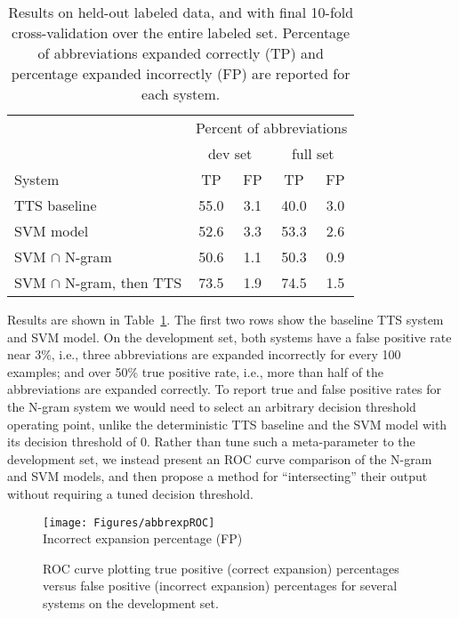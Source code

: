 \documentclass[11pt]{article}
\begin{document}
\begin{table}[b!]\vspace*{-0.15in}
\begin{center}
{\footnotesize
\begin{tabular}{|l|c|c||c|c|}
\hline
& \multicolumn{4}{c|}{Percent of abbreviations}\\
& \multicolumn{2}{c||}{dev set} & \multicolumn{2}{c|}{full set}\\
System & TP & FP  & TP & FP\\\hline
TTS baseline & 55.0 & 3.1 & 40.0 & 3.0\\\hline
SVM model & 52.6 & 3.3 & 53.3 & 2.6\\\hline\hline
SVM $\cap$ N-gram  & 50.6 & 1.1 & 50.3 & 0.9\\\hline
SVM $\cap$ N-gram, then TTS  & 73.5 & 1.9 & 74.5 & 1.5\\
\hline
\end{tabular}\vspace*{-0.1in} } %
\end{center}
\caption{\small \label{tab:results}Results on held-out labeled data,
  and with final 10-fold cross-validation over the entire labeled set.
  Percentage of abbreviations expanded correctly (TP) and percentage
expanded incorrectly (FP) are reported for each system.}
\end{table}

Results are shown in Table~\ref{tab:results}.  The first two rows show the
baseline TTS system and SVM model. On the
development set, both systems have a false positive rate near 3\%, i.e., three
abbreviations are expanded incorrectly for every 100 examples; and over 50\%
true positive rate, i.e., more than half of the abbreviations are expanded
correctly.  To report true and false positive rates for the N-gram system we
would need to select an arbitrary decision threshold operating point, unlike the
deterministic TTS baseline and the SVM model with its decision threshold of 0.
Rather than tune such a meta-parameter to the development set, we instead
present an ROC curve comparison of the N-gram and SVM models, and then propose a
method for ``intersecting'' their output without requiring a tuned decision
threshold.

\begin{figure}[t]
\begin{center}
\texttt{[image: Figures/abbrexpROC]}\vspace*{-0.1in}\\
{\scriptsize \hspace*{0.1in}Incorrect expansion percentage (FP)}\vspace*{-0.17in}
\end{center}
\caption{\small \label{fig:ROC} ROC curve plotting true positive
  (correct expansion) percentages versus false positive (incorrect
  expansion) percentages for several systems on the development set.}\vspace*{-0.22in}
\end{figure}
 
\end{document}
